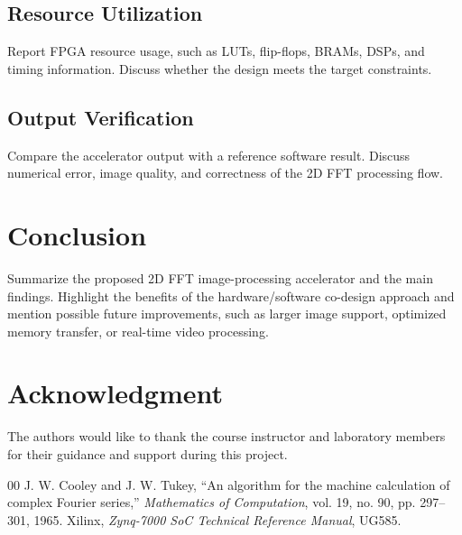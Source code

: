 \documentclass[conference]{IEEEtran}
\begin{document}
\subsection{Resource Utilization}
Report FPGA resource usage, such as LUTs, flip-flops, BRAMs, DSPs, and timing information. Discuss whether the design meets the target constraints.

\subsection{Output Verification}
Compare the accelerator output with a reference software result. Discuss numerical error, image quality, and correctness of the 2D FFT processing flow.

\section{Conclusion}\label{sec:conclusion}
Summarize the proposed 2D FFT image-processing accelerator and the main findings. Highlight the benefits of the hardware/software co-design approach and mention possible future improvements, such as larger image support, optimized memory transfer, or real-time video processing.

\section*{Acknowledgment}
The authors would like to thank the course instructor and laboratory members for their guidance and support during this project.

\begin{thebibliography}{00}
     J. W. Cooley and J. W. Tukey, ``An algorithm for the machine calculation of complex Fourier series,'' \textit{Mathematics of Computation}, vol. 19, no. 90, pp. 297--301, 1965.
     Xilinx, \textit{Zynq-7000 SoC Technical Reference Manual}, UG585.
\end{thebibliography}
\end{document}
